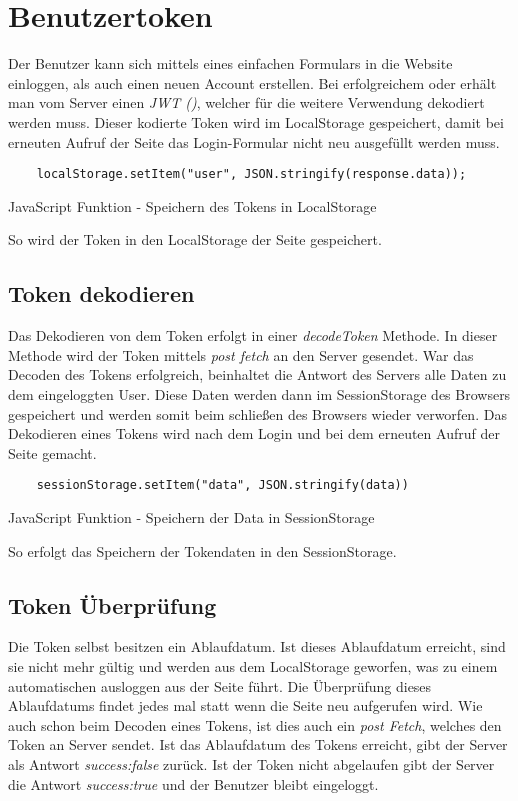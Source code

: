 \section{Benutzertoken}
\label{benutzer}

Der Benutzer kann sich mittels eines einfachen Formulars in die Website einloggen, als auch einen neuen 
Account erstellen. Bei erfolgreichem  oder  erhält man vom Server einen 
\textit{JWT ()}, welcher für die weitere Verwendung dekodiert werden muss. Dieser kodierte 
Token wird im LocalStorage gespeichert, damit bei erneuten Aufruf der Seite das Login-Formular nicht neu 
ausgefüllt werden muss.
\begin{code}[htp]
\begin{lstlisting}
    localStorage.setItem("user", JSON.stringify(response.data));
\end{lstlisting}
\caption{JavaScript Funktion - Speichern des Tokens in LocalStorage}
\end{code}
So wird der Token in den LocalStorage der Seite gespeichert.
\subsection{Token dekodieren}

Das Dekodieren von dem Token erfolgt in einer \textit{decodeToken} Methode. In dieser Methode wird der 
Token mittels \textit{post fetch} an den Server gesendet. War das Decoden des Tokens erfolgreich, 
beinhaltet die Antwort des Servers alle Daten zu dem eingeloggten User. Diese Daten werden dann im 
SessionStorage des Browsers gespeichert und werden somit beim schließen des Browsers wieder verworfen. 
Das Dekodieren eines Tokens wird nach dem Login und bei dem erneuten Aufruf der Seite gemacht.
\begin{code}[htp]
\begin{lstlisting}
    sessionStorage.setItem("data", JSON.stringify(data))
\end{lstlisting}
\caption{JavaScript Funktion - Speichern der Data in SessionStorage}
\end{code}

So erfolgt das Speichern der Tokendaten in den SessionStorage.

\subsection{Token Überprüfung}

Die Token selbst besitzen ein Ablaufdatum. Ist dieses Ablaufdatum erreicht, sind sie nicht mehr 
gültig und werden aus dem LocalStorage geworfen, was zu einem automatischen ausloggen aus der Seite führt. Die Überprüfung dieses Ablaufdatums 
findet jedes mal statt wenn die Seite neu aufgerufen wird. Wie auch schon beim Decoden eines Tokens,
ist dies auch ein \textit{post Fetch}, welches den Token an Server sendet. Ist das Ablaufdatum des
Tokens erreicht, gibt der Server als Antwort \textit{success:false} zurück. 
Ist der Token nicht abgelaufen gibt der Server die Antwort \textit{success:true} und 
der Benutzer bleibt eingeloggt. 

